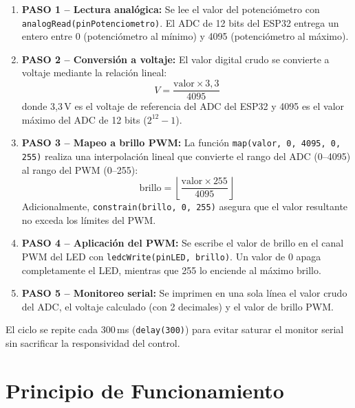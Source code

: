 \documentclass[12pt,a4paper]{article}
\begin{document}
\begin{enumerate}
    \item \textbf{PASO 1 -- Lectura analógica:} Se lee el valor del potenciómetro con \texttt{analogRead(pinPotenciometro)}. El ADC de 12 bits del ESP32 entrega un entero entre 0 (potenciómetro al mínimo) y 4095 (potenciómetro al máximo).
    
    \item \textbf{PASO 2 -- Conversión a voltaje:} El valor digital crudo se convierte a voltaje mediante la relación lineal:
    \begin{equation}
    V = \frac{\text{valor} \times 3{,}3}{4095}
    \label{eq:voltaje}
    \end{equation}
    donde 3,3\,V es el voltaje de referencia del ADC del ESP32 y 4095 es el valor máximo del ADC de 12 bits ($2^{12} - 1$).
    
    \item \textbf{PASO 3 -- Mapeo a brillo PWM:} La función \texttt{map(valor, 0, 4095, 0, 255)} realiza una interpolación lineal que convierte el rango del ADC (0--4095) al rango del PWM (0--255):
    \begin{equation}
    \text{brillo} = \left\lfloor \frac{\text{valor} \times 255}{4095} \right\rfloor
    \label{eq:brillo}
    \end{equation}
    Adicionalmente, \texttt{constrain(brillo, 0, 255)} asegura que el valor resultante no exceda los límites del PWM.
    
    \item \textbf{PASO 4 -- Aplicación del PWM:} Se escribe el valor de brillo en el canal PWM del LED con \texttt{ledcWrite(pinLED, brillo)}. Un valor de 0 apaga completamente el LED, mientras que 255 lo enciende al máximo brillo.
    
    \item \textbf{PASO 5 -- Monitoreo serial:} Se imprimen en una sola línea el valor crudo del ADC, el voltaje calculado (con 2 decimales) y el valor de brillo PWM.
\end{enumerate}

El ciclo se repite cada 300\,ms (\texttt{delay(300)}) para evitar saturar el monitor serial sin sacrificar la responsividad del control.

\section{Principio de Funcionamiento}
\end{document}

